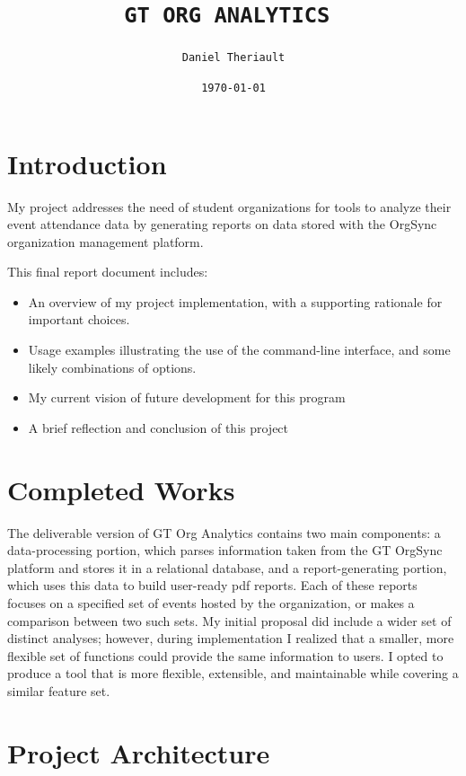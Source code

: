 \documentclass[12pt]{article}
\title{\texttt{{\Huge GT ORG ANALYTICS} \linebreak {\normalsize Final Report, CS 4365 Spring 2017}}}
\author{\texttt{{\normalsize Daniel Theriault}}}
\date{\texttt{{\normalsize \today}}}
\begin{document}
\maketitle \pagebreak


\section*{Introduction}

My project addresses the need of student organizations for tools to analyze their event attendance data by generating reports on data stored with the OrgSync organization management platform.

This final report document includes:
\begin{itemize}
    \item An overview of my project implementation, with a supporting rationale for important choices.
    \item Usage examples illustrating the use of the command-line interface, and some likely combinations of options.
    \item My current vision of future development for this program
    \item A brief reflection and conclusion of this project
\end{itemize}


\section*{Completed Works}
The deliverable version of GT Org Analytics contains two main components: a data-processing portion, which parses information taken from the GT OrgSync platform and stores it in a relational database, and a report-generating portion, which uses this data to build user-ready pdf reports.
Each of these reports focuses on a specified set of events hosted by the organization, or makes a comparison between two such sets.
My initial proposal did include a wider set of distinct analyses; however, during implementation I realized that a smaller, more flexible set of functions could provide the same information to users.
I opted to produce a tool that is more flexible, extensible, and maintainable while covering a similar feature set.


\section*{Project Architecture}
\end{document}
